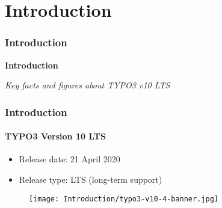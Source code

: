 %

\section{Introduction}
\begin{frame}[fragile]
	\frametitle{Introduction}

	\begin{center}\huge{\color{typo3darkgrey}\textbf{Introduction}}\end{center}
	\begin{center}\large{\textit{Key facts and figures about TYPO3 v10 LTS}}\end{center}

\end{frame}


\begin{frame}[fragile]
	\frametitle{Introduction}
	\framesubtitle{TYPO3 Version 10 LTS}

	\begin{itemize}
		\item Release date: 21 April 2020
		\item Release type: LTS (long-term support)
	\end{itemize}

	\begin{figure}
		\texttt{[image: Introduction/typo3-v10-4-banner.jpg]}
	\end{figure}

\end{frame}


